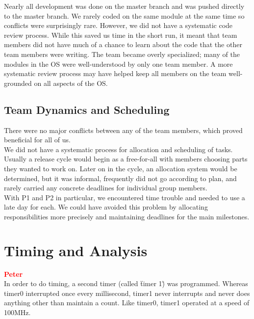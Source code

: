 \documentclass[12pt]{report}
\begin{document}
Nearly all development was done on the master branch and was pushed directly to the master branch. We rarely coded on the same module at the same time so conflicts were surprisingly rare. However, we did not have a systematic code review process. While this saved us time in the short run, it meant that team members did not have much of a chance to learn about the code that the other team members were writing. The team became overly specialized; many of the modules in the OS were well-understood by only one team member. A more systematic review process may have helped keep all members on the team well-grounded on all aspects of the OS.\\

\section{Team Dynamics and Scheduling}

There were no major conflicts between any of the team members, which proved beneficial for all of us.\\

We did not have a systematic process for allocation and scheduling of tasks. Usually a release cycle would begin as a free-for-all with members choosing parts they wanted to work on. Later on in the cycle, an allocation system would be determined, but it was informal, frequently did not go according to plan, and rarely carried any concrete deadlines for individual group members.\\

With P1 and P2 in particular, we encountered time trouble and needed to use a late day for each. We could have avoided this problem by allocating responsibilities more precisely and maintaining deadlines for the main milestones.\\

\chapter{Timing and Analysis}

\textcolor{red}{\textbf{Peter}} \\

In order to do timing, a second timer (called \"timer 1\") was programmed. Whereas timer0 interrupted once every millisecond, timer1 never interrupts and never does anything other than maintain a count. Like timer0, timer1 operated at a speed of 100MHz.\\
\end{document}
